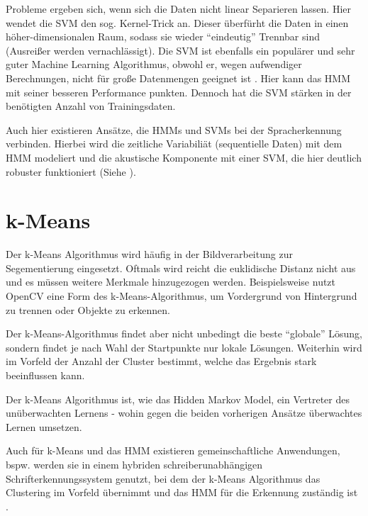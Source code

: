 Probleme ergeben sich, wenn sich die Daten nicht linear Separieren lassen. Hier wendet die SVM den sog. Kernel-Trick an. Dieser überfürht die Daten in einen höher-dimensionalen Raum, sodass sie wieder ``eindeutig'' Trennbar sind (Ausreißer werden vernachlässigt).
Die SVM ist ebenfalls ein populärer und sehr guter Machine Learning Algorithmus, obwohl er, wegen aufwendiger Berechnungen, nicht für große Datenmengen geeignet ist \cite[119]{marsland}. Hier kann das HMM mit seiner besseren Performance punkten. Dennoch hat die SVM stärken in der benötigten Anzahl von Trainingsdaten.

Auch hier existieren Ansätze, die HMMs und SVMs bei der Spracherkennung verbinden. Hierbei wird die zeitliche Variabiliät (sequentielle Daten) mit dem HMM modeliert und die akustische Komponente mit einer SVM, die hier deutlich robuster funktioniert (Siehe \cite{hmmsvm}).


\section{k-Means} \label{sec:kmeans}
Der k-Means Algorithmus wird häufig in der Bildverarbeitung zur Segementierung eingesetzt. Oftmals wird reicht die euklidische Distanz nicht aus und es müssen weitere Merkmale hinzugezogen werden. Beispielsweise nutzt OpenCV eine Form des k-Means-Algorithmus, um Vordergrund von Hintergrund zu trennen oder Objekte zu erkennen.

Der k-Means-Algorithmus findet aber nicht unbedingt die beste ``globale'' Lösung, sondern findet je nach Wahl der Startpunkte nur lokale Lösungen. Weiterhin wird im Vorfeld der Anzahl der Cluster bestimmt, welche das  Ergebnis stark beeinflussen kann.

Der k-Means Algorithmus ist, wie das Hidden Markov Model, ein Vertreter des unüberwachten Lernens - wohin gegen die beiden vorherigen Ansätze überwachtes Lernen umsetzen. 

Auch für k-Means und das HMM existieren gemeinschaftliche Anwendungen, bspw. werden sie in einem hybriden schreiberunabhängigen Schrifterkennungssystem genutzt, bei dem der k-Means Algorithmus das Clustering im Vorfeld übernimmt und das HMM für die Erkennung zuständig ist \cite{hmmkm}. 
